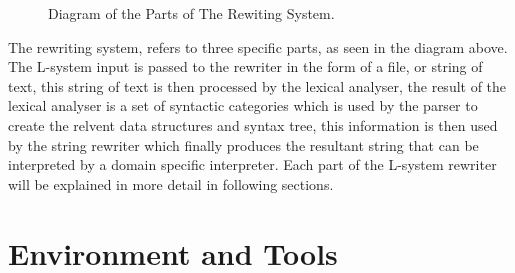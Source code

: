 \begin{flushleft}
\vspace{5mm}

\begin{figure}[htbp]
	{\centering
		\setlength{\fboxrule}{1pt}
		\vspace{7px}
		\caption{Diagram of the Parts of The Rewiting System.} \label{3D rotations}
	}
\end{figure}
\FloatBarrier

The rewriting system, refers to three specific parts, as seen in the diagram above. The L-system input is passed to the rewriter in the form of a file, or string of text, this string of text is then processed by the lexical analyser, the result of the lexical analyser is a set of syntactic categories which is used by the parser to create the relvent data structures and syntax tree, this information is then used by the string rewriter which finally produces the resultant string that can be interpreted by a domain specific interpreter. Each part of the L-system rewriter will be explained in more detail in following sections. \\

\end{flushleft}

\section{Environment and Tools}

